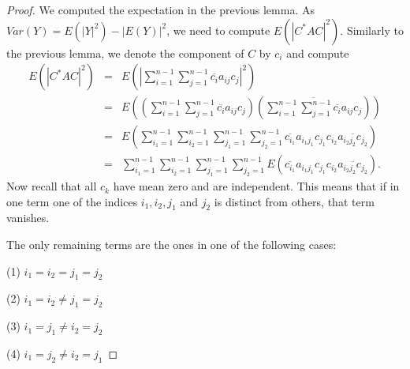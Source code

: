 \documentclass[12pt,a4paper,leqno]{report}
\theoremstyle{plain}
\theoremstyle{definition}
\theoremstyle{remark}
\begin{document}
\begin{proof}
We computed the expectation in the previous lemma. As $Var(Y) = E(|Y|^2)-|E(Y)|^2$, we need to compute $E(|C^* A C|^2)$. Similarly to the previous lemma, we denote the component of $C$ by $c_i$ and compute
\begin{eqnarray*}
E(|C^* A C|^2) & = & E(|\sum_{i=1}^{n-1} \sum_{j=1}^{n-1} \overline{c_i} a_{ij} c_j|^2)\\
& = & E((\sum_{i=1}^{n-1} \sum_{j=1}^{n-1} \overline{c_i} a_{ij} c_j)
(\overline{\sum_{i=1}^{n-1} \sum_{j=1}^{n-1} \overline{c_i} a_{ij} c_j}))\\
& = & E (\sum_{i_1=1}^{n-1}\sum_{i_2=1}^{n-1}
\sum_{j_1=1}^{n-1}\sum_{j_2=1}^{n-1} 
\overline{c_{i_1}} a_{i_1j_1} c_{j_1}c_{i_2} \overline{a_{i_2j_2} c_{j_2}})\\
& = & \sum_{i_1=1}^{n-1}\sum_{i_2=1}^{n-1}
\sum_{j_1=1}^{n-1}\sum_{j_2=1}^{n-1} 
E(\overline{c_{i_1}} a_{i_1j_1} c_{j_1}c_{i_2} \overline{a_{i_2j_2} c_{j_2}}).
\end{eqnarray*}
Now recall that all $c_k$ have mean zero and are independent. This means that if in one term one of the indices $i_1, i_2, j_1$ and $j_2$ is distinct from others, that term vanishes.

The only remaining terms are the ones in one of the following cases:

(1) $i_1 = i_2 = j_1 = j_2$

(2) $i_1=i_2 \neq j_1=j_2$

(3) $i_1 = j_1 \neq i_2 = j_2$

(4) $i_1 = j_2 \neq i_2 = j_1$


\end{proof}
\end{document}
